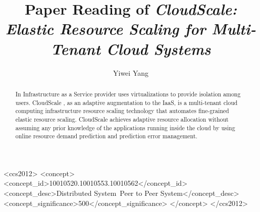 \documentclass[acmlarge]{acmart}
\begin{document}
\title{Paper Reading of \textit{CloudScale: Elastic Resource Scaling for Multi-Tenant Cloud Systems}}

\author{Yiwei Yang}

\renewcommand{\shortauthors}{Yiwei Yang}

\begin{abstract}
  In Infrastructure as a Service provider uses virtualizations to provide isolation among users. CloudScale \cite{shen2011cloudscale}, as an adaptive augmentation to the IaaS, is a multi-tenant cloud computing infrastructure resource scaling technology that automates fine-grained elastic resource scaling. CloudScale achieves adaptive resource allocation without assuming any prior knowledge of the applications running inside the cloud by using online resource demand prediction and prediction error management.
\end{abstract}
\begin{CCSXML}
  <ccs2012>
  <concept>
  <concept_id>10010520.10010553.10010562</concept_id>
  <concept_desc>Distributed System~Peer to Peer System</concept_desc>
  <concept_significance>500</concept_significance>
  </concept>
  </ccs2012>
\end{CCSXML}


\keywords{}
\end{document}
